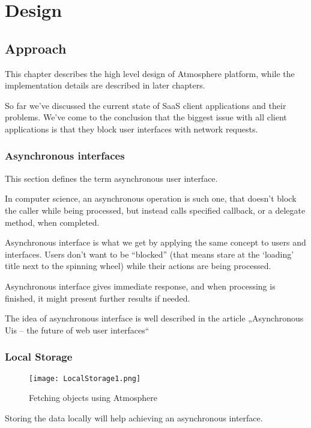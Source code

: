 \section{Design}

\subsection{Approach}

This chapter describes the high level design of Atmosphere platform, while the implementation details are described in later chapters. 

So far we’ve discussed the current state of SaaS client applications and their problems. We’ve come to the conclusion that the biggest issue with all client applications is that they block user interfaces with network requests. 

\subsubsection{Asynchronous interfaces}

This section defines the term asynchronous user interface.

In computer science, an asynchronous operation is such one, that doesn’t block the caller while being processed, but instead calls specified callback, or a delegate method, when completed.

Asynchronous interface is what we get by applying the same concept to users and interfaces. Users don’t want to be “blocked” (that means stare at the ‘loading’ title next to the spinning wheel) while their actions are being processed.

Asynchronous interface gives immediate response, and when processing is finished, it might present further results if needed.

The idea of asynchronous interface is well described in the article „Asynchronous Uis – the future of web user interfaces“ \citep{maccaw_async}

\subsubsection{Local Storage}

\begin{figure}[ht!]
\centering
\texttt{[image: LocalStorage1.png]}
\caption{Fetching objects using Atmosphere \label{fig:1}}
\end{figure}

Storing the data locally will help achieving an asynchronous interface. 

